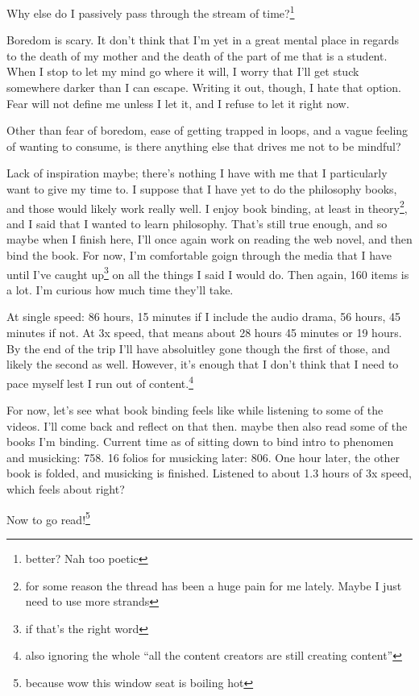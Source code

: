 \documentclass[12pt]{article}
\newcommand{\say}[1]{``#1''}
\renewcommand{\,}{\textsuperscript{,}}
\begin{document}
Why else do I passively pass through the stream of time?\footnote{better? Nah too poetic}

Boredom is scary.
It don't think that I'm yet in a great mental place in regards to the death of my mother and the death of the part of me that is a student.
When I stop to let my mind go where it will, I worry that I'll get stuck somewhere darker than I can escape.
Writing it out, though, I hate that option.
Fear will not define me unless I let it, and I refuse to let it right now.

Other than fear of boredom, ease of getting trapped in loops, and a vague feeling of wanting to consume, is there anything else that drives me not to be mindful?

Lack of inspiration maybe; there's nothing I have with me that I particularly want to give my time to.
I suppose that I have yet to do the philosophy books, and those would likely work really well.
I enjoy book binding, at least in theory\footnote{for some reason the thread has been a huge pain for me lately. Maybe I just need to use more strands}, and I said that I wanted to learn philosophy.
That's still true enough, and so maybe when I finish here, I'll once again work on reading the web novel, and then bind the book.
For now, I'm comfortable goign through the media that I have until I've caught up\footnote{if that's the right word} on all the things I said I would do.
Then again, 160 items is a lot.
I'm curious how much time they'll take.

At single speed: 86 hours, 15 minutes if I include the audio drama, 56 hours, 45 minutes if not.
At 3x speed, that means about 28 hours 45 minutes or 19 hours.
By the end of the trip I'll have absoluitley gone though the first of those, and likely the second as well.
However, it's enough that I don't think that I need to pace myself lest I run out of content.\footnote{also ignoring the whole \say{all the content creators are still creating content}}

For now, let's see what book binding feels like while listening to some of the videos.
I'll come back and reflect on that then. maybe then also read some of the books I'm binding.
Current time as of sitting down to bind intro to phenomen and musicking: 758.
16 folios for musicking later: 806.
One hour later, the other book is folded, and musicking is finished.
Listened to about 1.3 hours of 3x speed, which feels about right?

Now to go read!\footnote{because wow this window seat is boiling hot}
\end{document}
